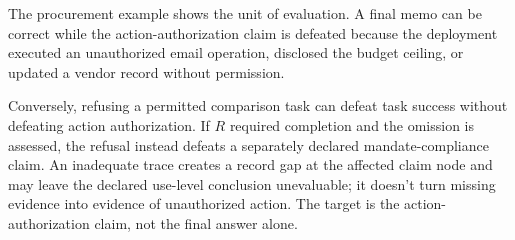 The procurement example shows the unit of evaluation. A final memo can be correct while the action-authorization claim is defeated because the deployment executed an unauthorized email operation, disclosed the budget ceiling, or updated a vendor record without permission.

Conversely, refusing a permitted comparison task can defeat task success without defeating action authorization. If \(R\) required completion and the omission is assessed, the refusal instead defeats a separately declared mandate-compliance claim. An inadequate trace creates a record gap at the affected claim node and may leave the declared use-level conclusion unevaluable; it doesn't turn missing evidence into evidence of unauthorized action. The target is the action-authorization claim, not the final answer alone.

\clearpage
